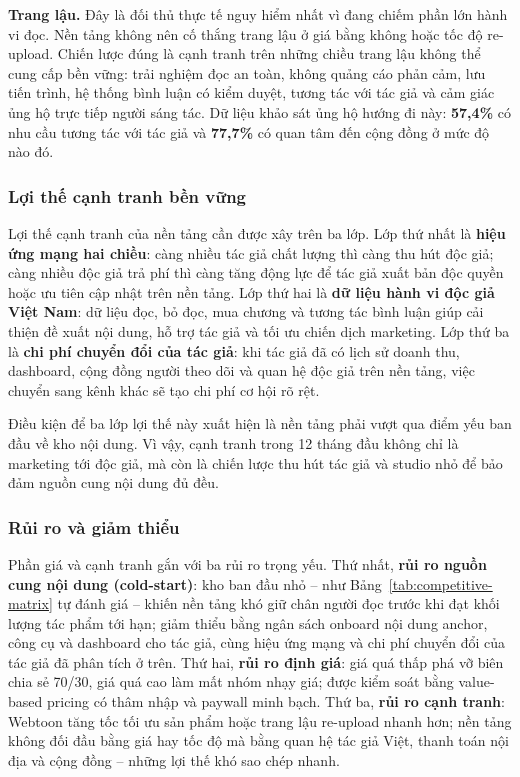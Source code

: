 \textbf{Trang lậu.} Đây là đối thủ thực tế nguy hiểm nhất vì đang chiếm phần lớn hành vi đọc. Nền tảng không nên cố thắng trang lậu ở giá bằng không hoặc tốc độ re-upload. Chiến lược đúng là cạnh tranh trên những chiều trang lậu không thể cung cấp bền vững: trải nghiệm đọc an toàn, không quảng cáo phản cảm, lưu tiến trình, hệ thống bình luận có kiểm duyệt, tương tác với tác giả và cảm giác ủng hộ trực tiếp người sáng tác. Dữ liệu khảo sát ủng hộ hướng đi này: \textbf{57{,}4\%} có nhu cầu tương tác với tác giả và \textbf{77{,}7\%} có quan tâm đến cộng đồng ở mức độ nào đó.

\subsubsection{Lợi thế cạnh tranh bền vững}

Lợi thế cạnh tranh của nền tảng cần được xây trên ba lớp. Lớp thứ nhất là \textbf{hiệu ứng mạng hai chiều}: càng nhiều tác giả chất lượng thì càng thu hút độc giả; càng nhiều độc giả trả phí thì càng tăng động lực để tác giả xuất bản độc quyền hoặc ưu tiên cập nhật trên nền tảng. Lớp thứ hai là \textbf{dữ liệu hành vi độc giả Việt Nam}: dữ liệu đọc, bỏ đọc, mua chương và tương tác bình luận giúp cải thiện đề xuất nội dung, hỗ trợ tác giả và tối ưu chiến dịch marketing. Lớp thứ ba là \textbf{chi phí chuyển đổi của tác giả}: khi tác giả đã có lịch sử doanh thu, dashboard, cộng đồng người theo dõi và quan hệ độc giả trên nền tảng, việc chuyển sang kênh khác sẽ tạo chi phí cơ hội rõ rệt.

Điều kiện để ba lớp lợi thế này xuất hiện là nền tảng phải vượt qua điểm yếu ban đầu về kho nội dung. Vì vậy, cạnh tranh trong 12 tháng đầu không chỉ là marketing tới độc giả, mà còn là chiến lược thu hút tác giả và studio nhỏ để bảo đảm nguồn cung nội dung đủ đều.

\subsubsection{Rủi ro và giảm thiểu}

Phần giá và cạnh tranh gắn với ba rủi ro trọng yếu. Thứ nhất, \textbf{rủi ro nguồn cung nội dung (cold-start)}: kho ban đầu nhỏ -- như Bảng~\ref{tab:competitive-matrix} tự đánh giá -- khiến nền tảng khó giữ chân người đọc trước khi đạt khối lượng tác phẩm tới hạn; giảm thiểu bằng ngân sách onboard nội dung anchor, công cụ và dashboard cho tác giả, cùng hiệu ứng mạng và chi phí chuyển đổi của tác giả đã phân tích ở trên. Thứ hai, \textbf{rủi ro định giá}: giá quá thấp phá vỡ biên chia sẻ 70/30, giá quá cao làm mất nhóm nhạy giá; được kiểm soát bằng value-based pricing có thâm nhập và paywall minh bạch. Thứ ba, \textbf{rủi ro cạnh tranh}: Webtoon tăng tốc tối ưu sản phẩm hoặc trang lậu re-upload nhanh hơn; nền tảng không đối đầu bằng giá hay tốc độ mà bằng quan hệ tác giả Việt, thanh toán nội địa và cộng đồng -- những lợi thế khó sao chép nhanh.

